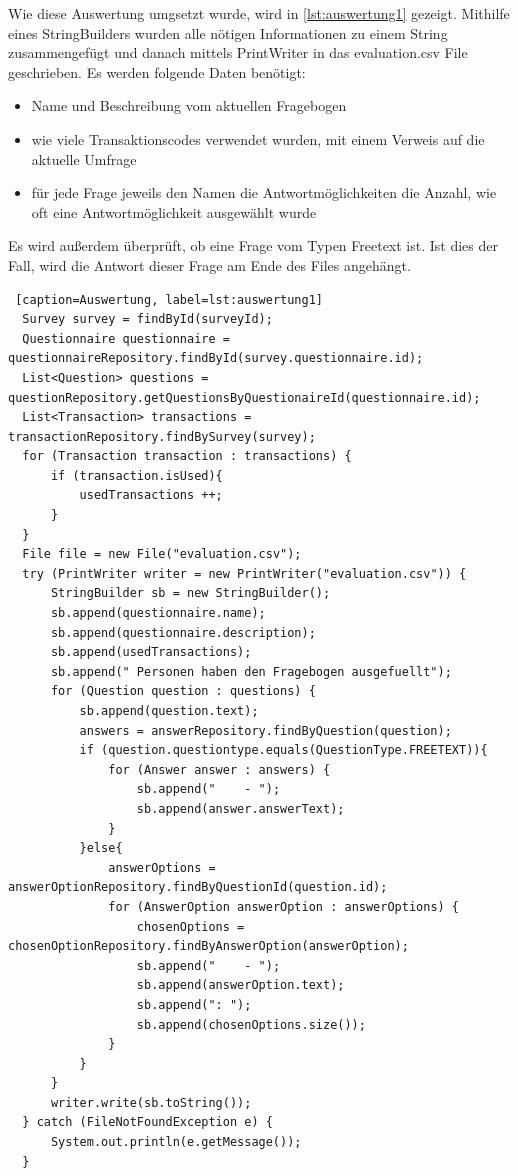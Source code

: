 Wie diese Auswertung umgsetzt wurde, wird in \ref{lst:auswertung1} gezeigt.
Mithilfe eines StringBuilders wurden alle nötigen Informationen zu einem String zusammengefügt und danach
mittels PrintWriter in das evaluation.csv File geschrieben. Es werden folgende Daten benötigt:
\begin{itemize}
  \item Name und Beschreibung vom aktuellen Fragebogen
  \item wie viele Transaktionscodes verwendet wurden, mit einem Verweis auf die aktuelle Umfrage
  \item für jede Frage jeweils
  \subitem den Namen
  \subitem die Antwortmöglichkeiten
  \subitem die Anzahl, wie oft eine Antwortmöglichkeit ausgewählt wurde
\end{itemize}
Es wird außerdem überprüft, ob eine Frage vom Typen Freetext ist. Ist dies der Fall, wird die Antwort dieser Frage
am Ende des Files angehängt.
\begin{lstlisting} [caption=Auswertung, label=lst:auswertung1]
  Survey survey = findById(surveyId);
  Questionnaire questionnaire = questionnaireRepository.findById(survey.questionnaire.id);
  List<Question> questions = questionRepository.getQuestionsByQuestionaireId(questionnaire.id);
  List<Transaction> transactions = transactionRepository.findBySurvey(survey);
  for (Transaction transaction : transactions) {
      if (transaction.isUsed){
          usedTransactions ++;
      }
  }
  File file = new File("evaluation.csv");
  try (PrintWriter writer = new PrintWriter("evaluation.csv")) {
      StringBuilder sb = new StringBuilder();
      sb.append(questionnaire.name);
      sb.append(questionnaire.description);
      sb.append(usedTransactions);
      sb.append(" Personen haben den Fragebogen ausgefuellt");
      for (Question question : questions) {
          sb.append(question.text);
          answers = answerRepository.findByQuestion(question);
          if (question.questiontype.equals(QuestionType.FREETEXT)){
              for (Answer answer : answers) {
                  sb.append("    - ");
                  sb.append(answer.answerText);
              }
          }else{
              answerOptions = answerOptionRepository.findByQuestionId(question.id);
              for (AnswerOption answerOption : answerOptions) {
                  chosenOptions = chosenOptionRepository.findByAnswerOption(answerOption);
                  sb.append("    - ");
                  sb.append(answerOption.text);
                  sb.append(": ");
                  sb.append(chosenOptions.size());
              }
          }
      }
      writer.write(sb.toString());
  } catch (FileNotFoundException e) {
      System.out.println(e.getMessage());
  }
\end{lstlisting}
